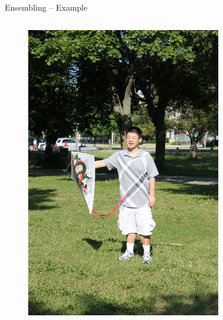 \documentclass{beamer}
\begin{document}
\begin{frame}{Ensembling -- Example}
\begin{columns}       
    \begin{figure}[h]
        \centering
        \includegraphics[width=1.0\linewidth]{images/COCO_val2014_000000530509.jpg}
        \vfill
    \end{figure}
    \begin{figure}[thp]
      \begin{center}
      \centering
\end{center}
\end{figure}
\end{columns}
\end{frame}
\end{document}
